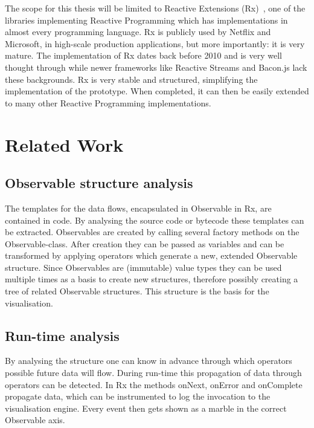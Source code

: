 

The scope for this thesis will be limited to Reactive Extensions (Rx)~\cite
{msdn_rx}, one of the libraries implementing Reactive Programming which
has implementations in almost every programming language.  Rx is
publicly used by Netflix and Microsoft, in high-scale production
applications, but more importantly:  it is very mature.  The
implementation of Rx dates back before 2010 and is very well thought
through while newer frameworks like Reactive Streams and Bacon.js lack
these backgrounds.  Rx is very stable and structured, simplifying the
implementation of the prototype. When completed, it can then be easily
extended to many other Reactive Programming implementations.

\section{Related Work}

\subsection{Observable structure analysis} The templates for the data
flows, encapsulated in Observable in Rx, are contained in code.  By
analysing the source code or bytecode these templates can be extracted.
Observables are created by calling several factory methods on the
Observable-class.  After creation they can be passed as variables and
can be transformed by applying operators which generate a new, extended
Observable structure.  Since Observables are (immutable) value types
they can be used multiple times as a basis to create new structures,
therefore possibly creating a tree of related Observable structures.
This structure is the basis for the visualisation.

\subsection{Run-time analysis} By analysing the structure one can know
in advance through which operators possible future data will flow.
During run-time this propagation of data through operators can be
detected.  In Rx the methods onNext, onError and onComplete propagate
data, which can be instrumented to log the invocation to the
visualisation engine.  Every event then gets shown as a marble in the
correct Observable axis.

